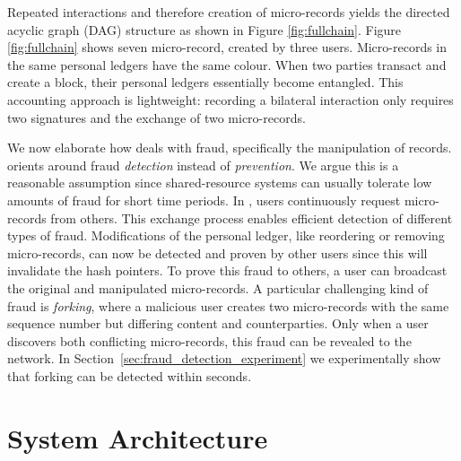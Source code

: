 Repeated interactions and therefore creation of micro-records yields the directed acyclic graph (DAG) structure as shown in Figure \ref{fig:fullchain}.
Figure \ref{fig:fullchain} shows seven micro-record, created by three users.
Micro-records in the same personal ledgers have the same colour.
When two parties transact and create a block, their personal ledgers essentially become entangled.
This accounting approach is lightweight: recording a bilateral interaction only requires two signatures and the exchange of two micro-records.

We now elaborate how \ModelName{} deals with fraud, specifically the manipulation of records.
\ModelName{} orients around fraud \emph{detection} instead of \emph{prevention}.
We argue this is a reasonable assumption since shared-resource systems can usually tolerate low amounts of fraud for short time periods.
In \ModelName{}, users continuously request micro-records from others.
This exchange process enables efficient detection of different types of fraud.
Modifications of the personal ledger, like reordering or removing micro-records, can now be detected and proven by other users since this will invalidate the hash pointers.
To prove this fraud to others, a user can broadcast the original and manipulated micro-records.
A particular challenging kind of fraud is \emph{forking}, where a malicious user creates two micro-records with the same sequence number but differing content and counterparties.
Only when a user discovers both conflicting micro-records, this fraud can be revealed to the network.
In Section~\ref{sec:fraud_detection_experiment} we experimentally show that forking can be detected within seconds.

\section{System Architecture}
\label{sec:system_architecture}


